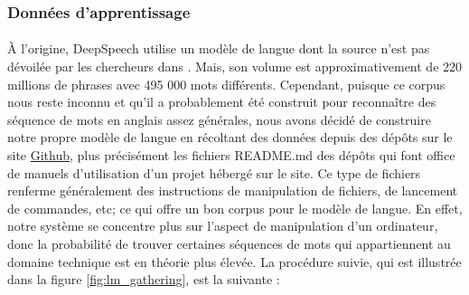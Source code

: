 		\subsubsection*{Données d'apprentissage}
		\paragraph{}
		À l'origine, DeepSpeech utilise un modèle de langue dont la source n'est pas dévoilée par les chercheurs dans \citep{deepspeech_paper}. Mais, son volume est approximativement de 220 millions de phrases avec 495 000 mots différents. Cependant, puisque ce corpus nous reste inconnu et qu'il a probablement été construit pour reconnaître des séquence de mots en anglais assez générales, nous avons décidé de construire notre propre modèle de langue en récoltant des données depuis des dépôts sur le site \href{https://github.com/}{Github}, plus précisément les fichiers README.md des dépôts qui font office de manuels d'utilisation d'un projet hébergé sur le site. Ce type de fichiers renferme généralement des instructions de manipulation de fichiers, de lancement de commandes, etc; ce qui offre un bon corpus pour le modèle de langue. En effet, notre système se concentre plus sur l'aspect de manipulation d'un ordinateur, donc la probabilité de trouver certaines séquences de mots qui appartiennent au domaine technique est en théorie plus élevée. La procédure suivie, qui est illustrée dans la figure \ref{fig:lm_gathering}, est la suivante : 
		
